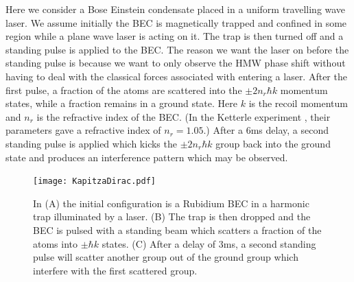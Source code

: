 \documentclass[twocolumn,english,pra,aps,superscriptaddress,floatfix]{revtex4-1}
\begin{document}
Here we consider a Bose Einstein condensate placed in a uniform travelling wave laser.  We assume initially the BEC is magnetically trapped and confined in some region while a plane wave laser is acting on it.  The trap is then turned off and a standing pulse is applied to the BEC.  The reason we want the laser on before the standing pulse is because we want to only observe the HMW phase shift without having to deal with the classical forces associated with entering a laser.
After the first pulse, a fraction of the atoms are scattered into the $\pm 2n_r\hbar k$ momentum states, while a fraction remains in a ground state. Here $k$ is the recoil momentum and $n_r$ is the refractive index of the BEC.  (In the Ketterle experiment \cite{ketterle}, their parameters gave a refractive index of $n_r=1.05$.) After a $6$ms delay, a second standing pulse is applied which kicks the $\pm 2n_r\hbar k$ group back into the ground state and produces an interference pattern which may be observed. 
\begin{figure}
\texttt{[image: KapitzaDirac.pdf]}
\caption{In (A) the initial configuration is a Rubidium BEC in a harmonic trap illuminated by a laser. (B) The trap is then dropped and the BEC is pulsed with a standing beam which scatters a fraction of the atoms into $\pm \hbar k$ states.  (C) After a delay of $3$ms, a second standing pulse will scatter another group out of the ground group which interfere with the first scattered group.} 
\label{fig:kapitz}
\end{figure}
\end{document}
